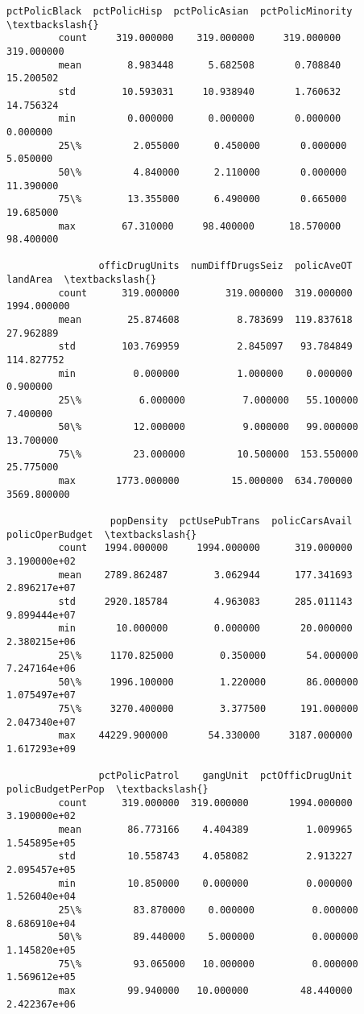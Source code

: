 \documentclass[11pt]{llncs}
\begin{document}
\begin{Verbatim}[commandchars=\\\{\}]
                pctPolicBlack  pctPolicHisp  pctPolicAsian  pctPolicMinority  \textbackslash{}
         count     319.000000    319.000000     319.000000        319.000000   
         mean        8.983448      5.682508       0.708840         15.200502   
         std        10.593031     10.938940       1.760632         14.756324   
         min         0.000000      0.000000       0.000000          0.000000   
         25\%         2.055000      0.450000       0.000000          5.050000   
         50\%         4.840000      2.110000       0.000000         11.390000   
         75\%        13.355000      6.490000       0.665000         19.685000   
         max        67.310000     98.400000      18.570000         98.400000   
         
                officDrugUnits  numDiffDrugsSeiz  policAveOT     landArea  \textbackslash{}
         count      319.000000        319.000000  319.000000  1994.000000   
         mean        25.874608          8.783699  119.837618    27.962889   
         std        103.769959          2.845097   93.784849   114.827752   
         min          0.000000          1.000000    0.000000     0.900000   
         25\%          6.000000          7.000000   55.100000     7.400000   
         50\%         12.000000          9.000000   99.000000    13.700000   
         75\%         23.000000         10.500000  153.550000    25.775000   
         max       1773.000000         15.000000  634.700000  3569.800000   
         
                  popDensity  pctUsePubTrans  policCarsAvail  policOperBudget  \textbackslash{}
         count   1994.000000     1994.000000      319.000000     3.190000e+02   
         mean    2789.862487        3.062944      177.341693     2.896217e+07   
         std     2920.185784        4.963083      285.011143     9.899444e+07   
         min       10.000000        0.000000       20.000000     2.380215e+06   
         25\%     1170.825000        0.350000       54.000000     7.247164e+06   
         50\%     1996.100000        1.220000       86.000000     1.075497e+07   
         75\%     3270.400000        3.377500      191.000000     2.047340e+07   
         max    44229.900000       54.330000     3187.000000     1.617293e+09   
         
                pctPolicPatrol    gangUnit  pctOfficDrugUnit  policBudgetPerPop  \textbackslash{}
         count      319.000000  319.000000       1994.000000       3.190000e+02   
         mean        86.773166    4.404389          1.009965       1.545895e+05   
         std         10.558743    4.058082          2.913227       2.095457e+05   
         min         10.850000    0.000000          0.000000       1.526040e+04   
         25\%         83.870000    0.000000          0.000000       8.686910e+04   
         50\%         89.440000    5.000000          0.000000       1.145820e+05   
         75\%         93.065000   10.000000          0.000000       1.569612e+05   
         max         99.940000   10.000000         48.440000       2.422367e+06   
         

\end{Verbatim}
\end{document}
